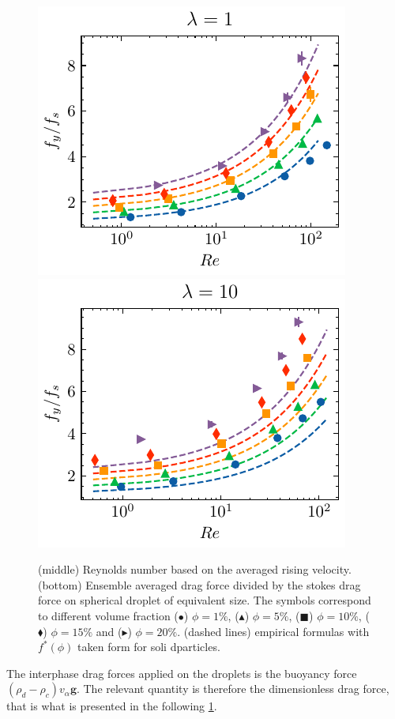 \begin{figure}[h!]
    \includegraphics[height = 0.35\textwidth]{image/HOMOGENEOUS/fCA/Fstokes_mu_r_1-0.pdf}
    \includegraphics[height = 0.35\textwidth]{image/HOMOGENEOUS/fCA/Fstokes_mu_r_0-1.pdf}
    \caption{
        (middle) Reynolds number based on the averaged rising velocity.
    (bottom) Ensemble averaged drag force divided by the stokes drag force on spherical droplet of equivalent size.
    The symbols correspond to different volume fraction ($\bullet$) $\phi = 1\%$, ($\blacktriangle$) $\phi = 5\%$, ($\blacksquare$) $\phi = 10\%$, ($\blacklozenge$) $\phi = 15\%$ and ($\blacktriangleright$) $\phi = 20\%$.
    (dashed lines) empirical formulas with $f^*(\phi)$ taken form \citet{rusche2000effect} for soli dparticles. }
    \label{fig:drag_force}
\end{figure}

The interphase drag forces applied on the droplets is the buoyancy force $(\rho_d-\rho_c)v_\alpha \textbf{g}$.
The relevant quantity is therefore the dimensionless drag force, that is what is presented in the following \ref{fig:drag_force}. 


